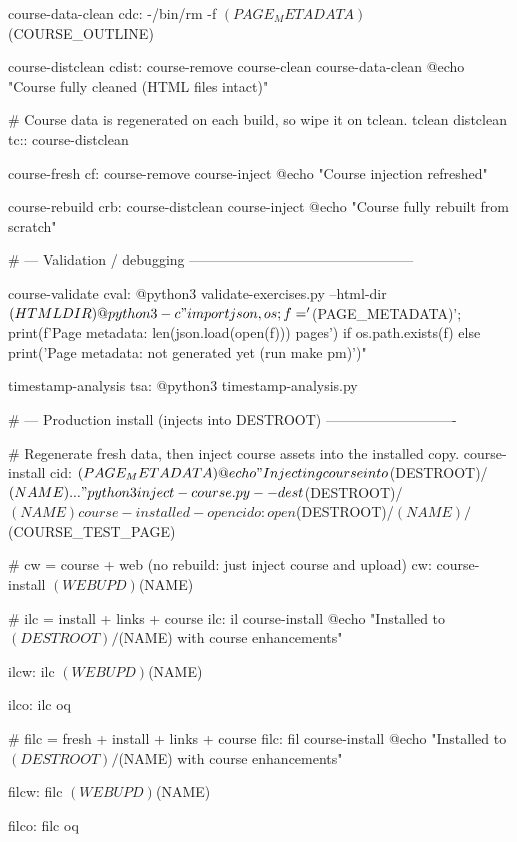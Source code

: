 \begin{tabular}
\begin{tabular}
course-data-clean cdc:
	-/bin/rm -f $(PAGE_METADATA) $(COURSE_OUTLINE)

course-distclean cdist: course-remove course-clean course-data-clean
	@echo "Course fully cleaned (HTML files intact)"

# Course data is regenerated on each build, so wipe it on tclean.
tclean distclean tc:: course-distclean

course-fresh cf: course-remove course-inject
	@echo "Course injection refreshed"

course-rebuild crb: course-distclean course-inject
	@echo "Course fully rebuilt from scratch"

# --- Validation / debugging ------------------------------------------------

course-validate cval:
	@python3 validate-exercises.py --html-dir $(HTMLDIR)
	@python3 -c "import json, os; f='$(PAGE_METADATA)'; print(f'Page metadata: {len(json.load(open(f)))} pages') if os.path.exists(f) else print('Page metadata: not generated yet (run make pm)')"

timestamp-analysis tsa:
	@python3 timestamp-analysis.py

# --- Production install (injects into DESTROOT) ----------------------------

# Regenerate fresh data, then inject course assets into the installed copy.
course-install cid: $(PAGE_METADATA)
	@echo "Injecting course into $(DESTROOT)/$(NAME)..."
	python3 inject-course.py --dest $(DESTROOT)/$(NAME)

course-installed-open cido:
	open $(DESTROOT)/$(NAME)/$(COURSE_TEST_PAGE)

# cw = course + web (no rebuild: just inject course and upload)
cw: course-install
	$(WEBUPD) $(NAME)

# ilc = install + links + course
ilc: il course-install
	@echo "Installed to $(DESTROOT)/$(NAME) with course enhancements"

ilcw: ilc
	$(WEBUPD) $(NAME)

ilco: ilc oq

# filc = fresh + install + links + course
filc: fil course-install
	@echo "Installed to $(DESTROOT)/$(NAME) with course enhancements"

filcw: filc
	$(WEBUPD) $(NAME)

filco: filc oq


\end{tabular}
\end{tabular}
